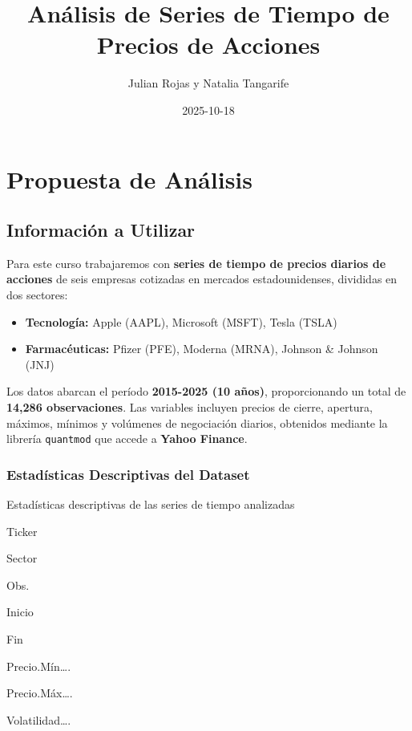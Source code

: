 \documentclass[
]{book}
\title{Análisis de Series de Tiempo de Precios de Acciones}
\author{Julian Rojas y Natalia Tangarife}
\date{2025-10-18}
\providecommand{\tightlist}{%
  \setlength{\itemsep}{0pt}\setlength{\parskip}{0pt}}
\begin{document}
\maketitle

{
\setcounter{tocdepth}{1}
\tableofcontents
}
\chapter*{Propuesta de Análisis}\label{propuesta-de-anuxe1lisis}

\section{Información a Utilizar}\label{informaciuxf3n-a-utilizar}

Para este curso trabajaremos con \textbf{series de tiempo de precios diarios de acciones} de seis empresas cotizadas en mercados estadounidenses, divididas en dos sectores:

\begin{itemize}
\tightlist
\item
  \textbf{Tecnología:} Apple (AAPL), Microsoft (MSFT), Tesla (TSLA)
\item
  \textbf{Farmacéuticas:} Pfizer (PFE), Moderna (MRNA), Johnson \& Johnson (JNJ)
\end{itemize}

Los datos abarcan el período \textbf{2015-2025 (10 años)}, proporcionando un total de \textbf{14,286 observaciones}. Las variables incluyen precios de cierre, apertura, máximos, mínimos y volúmenes de negociación diarios, obtenidos mediante la librería \texttt{quantmod} que accede a \textbf{Yahoo Finance}.

\subsection{Estadísticas Descriptivas del Dataset}\label{estaduxedsticas-descriptivas-del-dataset}

\label{tab:tabla-resumen}Estadísticas descriptivas de las series de tiempo analizadas

Ticker

Sector

Obs.

Inicio

Fin

Precio.Mín\ldots.

Precio.Máx\ldots.

Volatilidad\ldots.
\end{document}
